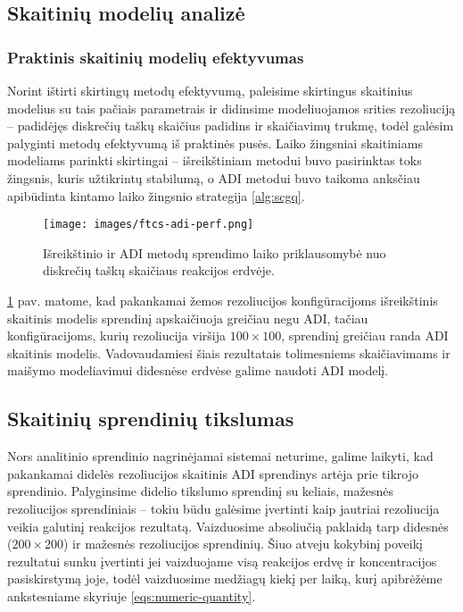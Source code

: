 \subsection{Skaitinių modelių analizė}


\subsubsection*{Praktinis skaitinių modelių efektyvumas}

Norint ištirti skirtingų metodų efektyvumą, paleisime skirtingus skaitinius modelius su tais pačiais parametrais ir didinsime modeliuojamos srities rezoliuciją -- padidėjęs diskrečių taškų skaičius padidins ir skaičiavimų trukmę, todėl galėsim palyginti metodų efektyvumą iš praktinės pusės. Laiko žingsniai skaitiniams modeliams parinkti skirtingai -- išreikštiniam metodui buvo pasirinktas toks žingsnis, kuris užtikrintų stabilumą, o ADI metodui buvo taikoma anksčiau apibūdinta kintamo laiko žingsnio strategija \eqref{alg:scgq}.

\begin{figure}[h!]
  \centering
  \texttt{[image: images/ftcs-adi-perf.png]}
  \caption{Išreikštinio ir ADI metodų sprendimo laiko priklausomybė nuo diskrečių taškų skaičiaus reakcijos erdvėje.}
  \label{fig:adi-ftcs-solve-time-comparison}
\end{figure}

\ref{fig:adi-ftcs-solve-time-comparison} pav. matome, kad pakankamai žemos rezoliucijos konfigūracijoms išreikštinis skaitinis modelis sprendinį apskaičiuoja greičiau negu ADI, tačiau konfigūracijoms, kurių rezoliucija viršija $100\times100$, sprendinį greičiau randa ADI skaitinis modelis. Vadovaudamiesi šiais rezultatais tolimesniems skaičiavimams ir maišymo modeliavimui didesnėse erdvėse galime naudoti ADI modelį.

\subsection*{Skaitinių sprendinių tikslumas}

Nors analitinio sprendinio nagrinėjamai sistemai neturime, galime laikyti, kad pakankamai didelės rezoliucijos skaitinis ADI sprendinys artėja prie tikrojo sprendinio. Palyginsime didelio tikslumo sprendinį su keliais, mažesnės rezoliucijos sprendiniais -- tokiu būdu galėsime įvertinti kaip jautriai rezoliucija veikia galutinį reakcijos rezultatą. Vaizduosime absoliučią paklaidą tarp didesnės ($200\times200$) ir mažesnės rezoliucijos sprendinių. Šiuo atveju kokybinį poveikį rezultatui sunku įvertinti jei vaizduojame visą reakcijos erdvę ir koncentracijos pasiskirstymą joje, todėl vaizduosime medžiagų kiekį per laiką, kurį apibrėžėme ankstesniame skyriuje \eqref{eqs:numeric-quantity}.

